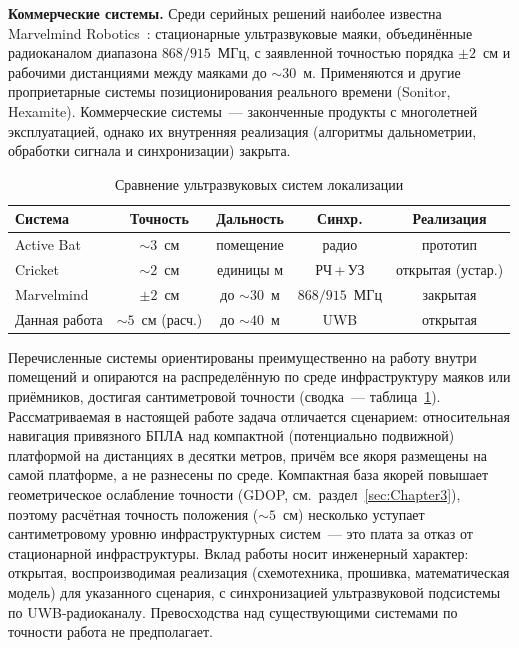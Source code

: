 \textbf{Коммерческие системы.} Среди серийных решений наиболее известна Marvelmind
Robotics~\cite{marvelmind}: стационарные ультразвуковые маяки, объединённые радиоканалом
диапазона $868/915$~МГц, с заявленной точностью порядка $\pm2$~см и рабочими дистанциями
между маяками до ${\sim}30$~м. Применяются и другие проприетарные системы позиционирования
реального времени (Sonitor, Hexamite). Коммерческие системы~--- законченные продукты с
многолетней эксплуатацией, однако их внутренняя реализация (алгоритмы дальнометрии,
обработки сигнала и синхронизации) закрыта.

\begin{table}[h!]
\centering
\small
\caption{Сравнение ультразвуковых систем локализации}
\label{tab:us-systems}
\begin{tabular}{lcccc}
\hline
Система & Точность & Дальность & Синхр. & Реализация \\
\hline
Active Bat    & ${\sim}3$~см       & помещение        & радио          & прототип          \\
Cricket       & ${\sim}2$~см       & единицы м        & РЧ\,+\,УЗ      & открытая (устар.) \\
Marvelmind    & $\pm2$~см          & до ${\sim}30$~м  & $868/915$~МГц  & закрытая          \\
Данная работа & ${\sim}5$~см (расч.) & до ${\sim}40$~м & UWB            & открытая          \\
\hline
\end{tabular}
\end{table}

Перечисленные системы ориентированы преимущественно на работу внутри помещений и опираются
на распределённую по среде инфраструктуру маяков или приёмников, достигая сантиметровой
точности (сводка~--- таблица~\ref{tab:us-systems}). Рассматриваемая в настоящей работе задача отличается сценарием: относительная
навигация привязного БПЛА над компактной (потенциально подвижной) платформой на дистанциях в
десятки метров, причём все якоря размещены на самой платформе, а не разнесены по среде.
Компактная база якорей повышает геометрическое ослабление точности (GDOP,
см.\ раздел~\ref{sec:Chapter3}), поэтому расчётная точность положения (${\sim}5$~см) несколько
уступает сантиметровому уровню инфраструктурных систем~--- это плата за отказ от стационарной
инфраструктуры. Вклад работы носит инженерный характер: открытая, воспроизводимая реализация
(схемотехника, прошивка, математическая модель) для указанного сценария, с синхронизацией
ультразвуковой подсистемы по UWB-радиоканалу. Превосходства над существующими системами по
точности работа не предполагает.
